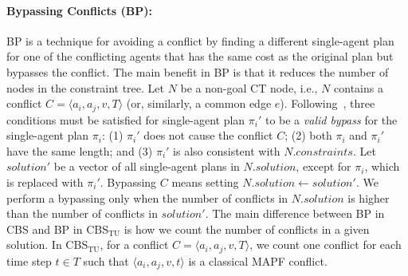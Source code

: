 \documentclass[jair,twoside,11pt,theapa]{article}
\newcommand{\tuple}[1]{\langle#1\rangle}
\newcommand{\cbstu}{CBS$\mathrm{_{TU}}$\xspace}
\begin{document}
\paragraph{Bypassing Conflicts (BP):}
BP is a technique for avoiding a conflict by finding a different single-agent plan for one of the conflicting agents that has the same cost as the original plan but bypasses the conflict. The main benefit in BP is that it reduces the number of nodes in the constraint tree. 
Let $N$ be a non-goal CT node, i.e., $N$ contains a conflict $C=\tuple{a_i,a_j,v,T}$ (or, similarly, a common edge $e$).
Following~, three conditions must be satisfied for single-agent plan ${\pi_i}'$ to be a \emph{valid bypass} for the single-agent plan $\pi_i$: (1) ${\pi_i}'$ does not cause the conflict $C$; (2) both $\pi_i$ and ${\pi_i}'$ have the same length; and (3) ${\pi_i}'$ is also consistent with $N.constraints$. Let $solution'$ be a vector of all single-agent plans in $N.solution$, except for ${\pi_i}$, which is replaced with ${\pi_i}'$. Bypassing $C$ means setting $N.solution\gets solution'$. We perform a bypassing only when the number of conflicts in $N.solution$ is higher than the number of conflicts in $solution'$. 
The main difference between BP in CBS and BP in \cbstu is how we count the number of conflicts in a given solution. In \cbstu, for a conflict $C=\tuple{a_i,a_j,v,T}$, we count one conflict for each time step $t\in T$ such that $\tuple{a_i,a_j,v,t}$ is a classical MAPF conflict. 
\end{document}
